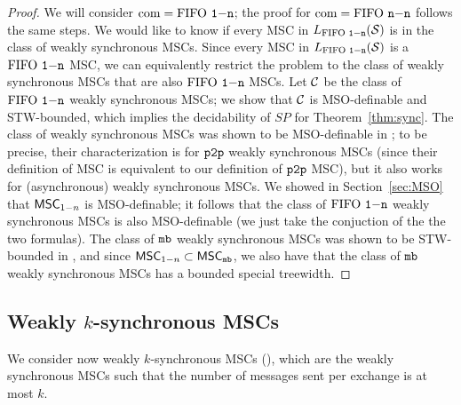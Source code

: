 \begin{proof}

	We will consider $\textup{com} = \text{FIFO } \mathtt{1\mathsf{-}n}$; the proof for $\textup{com} = \text{FIFO } \mathtt{n\mathsf{-}n}$ follows the same steps. We would like to know if every MSC in $L_{\text{FIFO } \mathtt{1\mathsf{-}n}}(\mathcal{S})$ is in the class of weakly synchronous MSCs. Since every MSC in $L_{\text{FIFO } \mathtt{1\mathsf{-}n}}(\mathcal{S})$ is a $\text{FIFO } \mathtt{1\mathsf{-}n}$ MSC, we can equivalently restrict the problem to the class of weakly synchronous MSCs that are also $\text{FIFO } \mathtt{1\mathsf{-}n}$ MSCs. Let $\mathcal{C}$ be the class of $\text{FIFO } \mathtt{1\mathsf{-}n}$ weakly synchronous MSCs; we show that $\mathcal{C}$ is MSO-definable and STW-bounded, which implies the decidability of $SP$ for Theorem~\ref{thm:sync}. The class of weakly synchronous MSCs was shown to be MSO-definable in \cite{BolligGFLLS21}; to be precise, their characterization is for $\mathtt{p2p}$ weakly synchronous MSCs (since their definition of MSC is equivalent to our definition of $\mathtt{p2p}$ MSC), but it also works for (asynchronous) weakly synchronous MSCs. We showed in Section~\ref{sec:MSO} that $\mathsf{MSC}_{1\mathsf{-}n}$ is MSO-definable; it follows that the class of $\text{FIFO } \mathtt{1\mathsf{-}n}$ weakly synchronous MSCs is also MSO-definable (we just take the conjuction of the the two formulas). The class of $\mathtt{mb}$ weakly synchronous MSCs was shown to be STW-bounded in \cite{BolligGFLLS21}, and since $\mathsf{MSC}_{1\mathsf{-}n} \subset \mathsf{MSC}_{\mathtt{mb}}$, we also have that the class of $\mathtt{mb}$ weakly synchronous MSCs has a bounded special treewidth. 
\end{proof}

\subsection{Weakly \texorpdfstring{$k$}{k}-synchronous MSCs}

We consider now weakly $k$-synchronous MSCs (\cite{BolligGFLLS21}), which are the weakly synchronous MSCs such that the number of messages sent per exchange is at most $k$.

